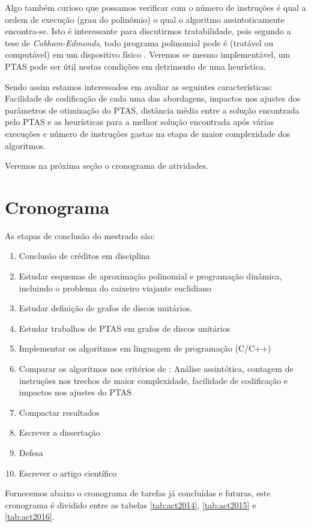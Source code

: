 Algo também curioso que possamos verificar com o número de instruções é qual a ordem de execução (grau do polinômio) o qual o algoritmo assintoticamente encontra-se. Isto é interessante para discutirmos tratabilidade, pois segundo a tese de \textit{Cobham-Edmonds}, todo programa polinomial pode é (tratável ou computável) em um dispositivo físico \cite{homer}. Veremos se mesmo implementável, um PTAS pode ser útil nestas condições em detrimento de uma heurística.

Sendo assim estamos interessados em avaliar as seguintes características: Facilidade de codificação de cada uma das abordagens, impactos nos ajustes dos parâmetros de otimização do PTAS, distância média entre a solução encontrada pelo PTAS e as heurísticas para a melhor solução encontrada após várias execuções e número de instruções gastas na etapa de maior complexidade dos algoritmos.

Veremos na próxima seção o cronograma de atividades.

\section{Cronograma}
\label{sec:cronograma}

As etapas de conclusão do mestrado são:

\begin{enumerate}
\item Conclusão de créditos em disciplina
\item Estudar esquemas de aproximação polinomial e programação dinâmica, incluindo o problema do caixeiro viajante euclidiano
\item Estudar definição de grafos de discos unitários.
\item Estudar trabalhos de PTAS em grafos de discos unitários
\item Implementar os algoritmos em linguagem de programação (C/C++)
\item Comparar os algoritmos nos critérios de : Análise assintótica, contagem de instruções nos trechos de maior complexidade, facilidade de codificação e impactos nos ajustes do PTAS
\item Compactar resultados
\item Escrever a dissertação
\item Defesa
\item Escrever o artigo científico
\end{enumerate}

Fornecemos abaixo o cronograma de tarefas já concluídas e futuras, este cronograma é dividido entre as tabelas \ref{tab:act2014}, \ref{tab:act2015} e \ref{tab:act2016}.

